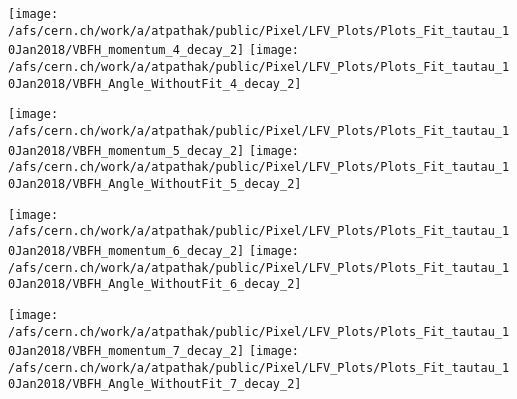 \documentclass{beamer}
\begin{document}
\begin{frame}
\begin{normalsize}
\begin{center}
\texttt{[image: /afs/cern.ch/work/a/atpathak/public/Pixel/LFV\_Plots/Plots\_Fit\_tautau\_10Jan2018/VBFH\_momentum\_4\_decay\_2]}
\texttt{[image: /afs/cern.ch/work/a/atpathak/public/Pixel/LFV\_Plots/Plots\_Fit\_tautau\_10Jan2018/VBFH\_Angle\_WithoutFit\_4\_decay\_2]} 
\end{center}
\end{normalsize}
\end {frame}
\begin{frame}
\begin{normalsize}
\begin{center}
\texttt{[image: /afs/cern.ch/work/a/atpathak/public/Pixel/LFV\_Plots/Plots\_Fit\_tautau\_10Jan2018/VBFH\_momentum\_5\_decay\_2]}
\texttt{[image: /afs/cern.ch/work/a/atpathak/public/Pixel/LFV\_Plots/Plots\_Fit\_tautau\_10Jan2018/VBFH\_Angle\_WithoutFit\_5\_decay\_2]} 
\end{center}
\end{normalsize}
\end {frame}
\begin{frame}
\begin{normalsize}
\begin{center}
\texttt{[image: /afs/cern.ch/work/a/atpathak/public/Pixel/LFV\_Plots/Plots\_Fit\_tautau\_10Jan2018/VBFH\_momentum\_6\_decay\_2]}
\texttt{[image: /afs/cern.ch/work/a/atpathak/public/Pixel/LFV\_Plots/Plots\_Fit\_tautau\_10Jan2018/VBFH\_Angle\_WithoutFit\_6\_decay\_2]} 
\end{center}
\end{normalsize}
\end {frame}
\begin{frame}
\begin{normalsize}
\begin{center}
\texttt{[image: /afs/cern.ch/work/a/atpathak/public/Pixel/LFV\_Plots/Plots\_Fit\_tautau\_10Jan2018/VBFH\_momentum\_7\_decay\_2]}
\texttt{[image: /afs/cern.ch/work/a/atpathak/public/Pixel/LFV\_Plots/Plots\_Fit\_tautau\_10Jan2018/VBFH\_Angle\_WithoutFit\_7\_decay\_2]} 
\end{center}
\end{normalsize}
\end {frame}
\end{document}
